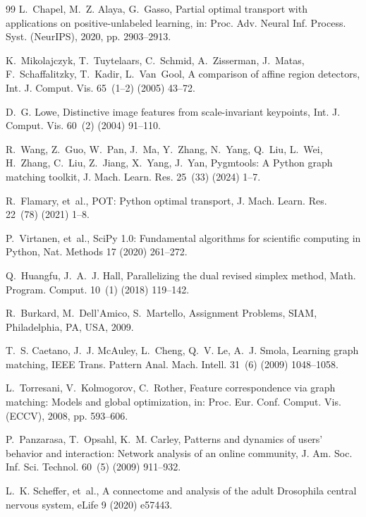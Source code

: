 \documentclass[a4paper,fleqn]{cas-dc}
\theoremstyle{thmstyleone}
\theoremstyle{thmstyletwo}
\theoremstyle{thmstylethree}
\begin{document}
\begin{thebibliography}{99}
L.~Chapel, M.~Z. Alaya, G.~Gasso, Partial optimal transport with applications on positive-unlabeled learning, in: Proc. Adv. Neural Inf. Process. Syst. (NeurIPS), 2020, pp. 2903--2913.

K.~Mikolajczyk, T.~Tuytelaars, C.~Schmid, A.~Zisserman, J.~Matas, F.~Schaffalitzky, T.~Kadir, L.~Van~Gool, A comparison of affine region detectors, Int. J. Comput. Vis. 65~(1--2) (2005) 43--72.

D.~G. Lowe, Distinctive image features from scale-invariant keypoints, Int. J. Comput. Vis. 60~(2) (2004) 91--110.

R.~Wang, Z.~Guo, W.~Pan, J.~Ma, Y.~Zhang, N.~Yang, Q.~Liu, L.~Wei, H.~Zhang, C.~Liu, Z.~Jiang, X.~Yang, J.~Yan, Pygmtools: A Python graph matching toolkit, J. Mach. Learn. Res. 25~(33) (2024) 1--7.

R.~Flamary, et~al., {POT}: Python optimal transport, J. Mach. Learn. Res. 22~(78) (2021) 1--8.

P.~Virtanen, et~al., {SciPy} 1.0: Fundamental algorithms for scientific computing in Python, Nat. Methods 17 (2020) 261--272.

Q.~Huangfu, J.~A.~J. Hall, Parallelizing the dual revised simplex method, Math. Program. Comput. 10~(1) (2018) 119--142.

R.~Burkard, M.~Dell'Amico, S.~Martello, Assignment Problems, SIAM, Philadelphia, PA, USA, 2009.

T.~S. Caetano, J.~J. McAuley, L.~Cheng, Q.~V. Le, A.~J. Smola, Learning graph matching, IEEE Trans. Pattern Anal. Mach. Intell. 31~(6) (2009) 1048--1058.

L.~Torresani, V.~Kolmogorov, C.~Rother, Feature correspondence via graph matching: Models and global optimization, in: Proc. Eur. Conf. Comput. Vis. (ECCV), 2008, pp. 593--606.

P.~Panzarasa, T.~Opsahl, K.~M. Carley, Patterns and dynamics of users' behavior and interaction: Network analysis of an online community, J. Am. Soc. Inf. Sci. Technol. 60~(5) (2009) 911--932.

L.~K. Scheffer, et~al., A connectome and analysis of the adult Drosophila central nervous system, eLife 9 (2020) e57443.


\end{thebibliography}
\end{document}
